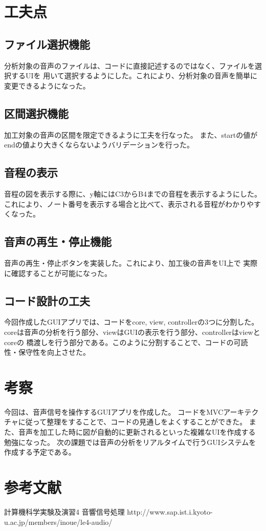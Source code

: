 \documentclass[a4paper,11pt]{jsarticle}
\begin{document}
\section{工夫点}
\subsection{ファイル選択機能}
分析対象の音声のファイルは、コードに直接記述するのではなく、ファイルを選択するUIを
用いて選択するようにした。これにより、分析対象の音声を簡単に変更できるようになった。

\subsection{区間選択機能}
加工対象の音声の区間を限定できるように工夫を行なった。
また、startの値がendの値より大きくならないようバリデーションを行った。

\subsection{音程の表示}
音程の図を表示する際に、y軸にはC3からB4までの音程を表示するようにした。
これにより、ノート番号を表示する場合と比べて、表示される音程がわかりやすくなった。

\subsection{音声の再生・停止機能}
音声の再生・停止ボタンを実装した。これにより、加工後の音声をUI上で
実際に確認することが可能になった。

\subsection{コード設計の工夫}
今回作成したGUIアプリでは、コードをcore, view, controllerの3つに分割した。
coreは音声の分析を行う部分、viewはGUIの表示を行う部分、controllerはviewとcoreの
橋渡しを行う部分である。このように分割することで、コードの可読性・保守性を向上させた。

\section{考察}
今回は、音声信号を操作するGUIアプリを作成した。
コードをMVCアーキテクチャに従って整理をすることで、コードの見通しをよくすることができた。
また、音声を加工した時に図が自動的に更新されるといった複雑なUIを作成する勉強になった。
次の課題では音声の分析をリアルタイムで行うGUIシステムを作成する予定である。


\section{参考文献}
計算機科学実験及演習4 音響信号処理\newline
http://www.sap.ist.i.kyoto-u.ac.jp/members/inoue/le4-audio/
\end{document}
